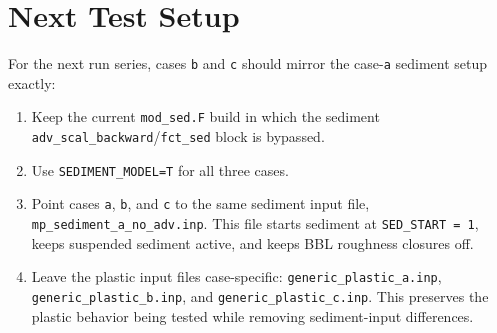 \documentclass[11pt]{article}
\begin{document}
\section*{Next Test Setup}
For the next run series, cases \texttt{b} and \texttt{c} should mirror the
case-\texttt{a} sediment setup exactly:
\begin{enumerate}
\item Keep the current \texttt{mod\_sed.F} build in which the sediment
\texttt{adv\_scal\_backward}/\texttt{fct\_sed} block is bypassed.
\item Use \texttt{SEDIMENT\_MODEL=T} for all three cases.
\item Point cases \texttt{a}, \texttt{b}, and \texttt{c} to the same sediment
input file, \texttt{mp\_sediment\_a\_no\_adv.inp}.  This file starts sediment
at \texttt{SED\_START = 1}, keeps suspended sediment active, and keeps BBL
roughness closures off.
\item Leave the plastic input files case-specific:
\texttt{generic\_plastic\_a.inp}, \texttt{generic\_plastic\_b.inp}, and
\texttt{generic\_plastic\_c.inp}.  This preserves the plastic behavior being
tested while removing sediment-input differences.
\end{enumerate}
\end{document}

